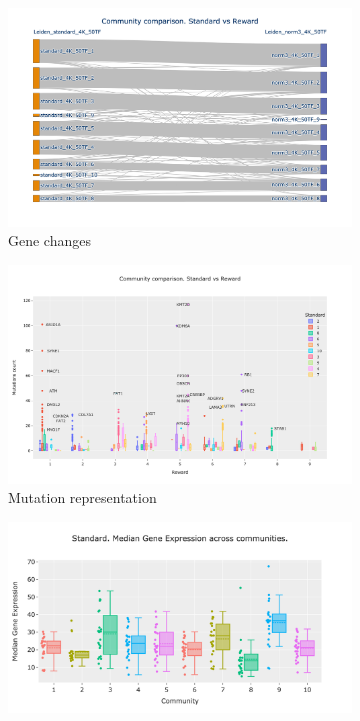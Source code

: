 {\begin{figure}[!htb]
    \hfill
    \begin{subfigure}[b]{0.49\textwidth}
        \centering
        \includegraphics[width=\textwidth,keepaspectratio]{Sections/Network_I/Resources/P0/Comms/Sky_Comm_Comp_4K_v3.png}
        \caption{Gene changes}
    \end{subfigure}
    \hfill
     \begin{subfigure}[b]{0.49\textwidth}
            \centering
            \includegraphics[width=\textwidth,keepaspectratio]{Sections/Network_I/Resources/P0/Comms/Mut_Comm_Comp_4K_v3.png}
            \caption{Mutation representation}
    \end{subfigure}
    \hfill
    \hfill
    \begin{subfigure}[b]{0.47\textwidth}
        \centering
        \includegraphics[width=\textwidth,keepaspectratio]{Sections/Network_I/Resources/P0/Comms/P0_standard_4K_50TF_med.png}

\end{subfigure}
\end{figure}}
